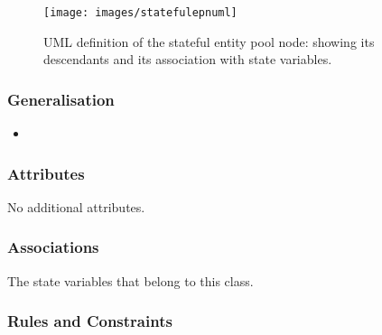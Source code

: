 \begin{figure}[htb]
  \centering
  \texttt{[image: images/statefulepnuml]}
\caption{UML definition of the stateful entity pool node: showing its
  descendants and its association with state variables.}
  \label{fig:techref:statefulepnuml}
\end{figure}

\subsubsection{Generalisation}

\begin{itemize}
\item {}
\end{itemize}

\subsubsection{Attributes}

No additional attributes.

\subsubsection{Associations}

\begin{attributes}
 The state variables
  that belong to this class.
\end{attributes}

\subsubsection{Rules and Constraints}

\begin{valrules}
\end{valrules}


